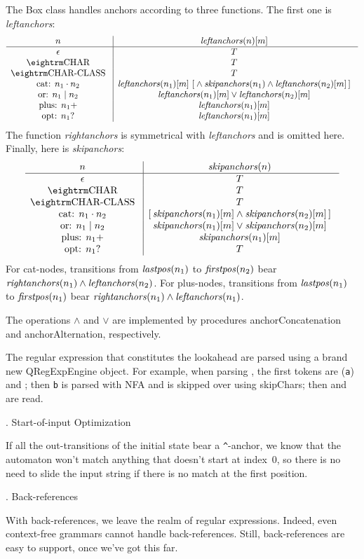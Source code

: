 The {\sf Box} class handles anchors according to three functions.  The first one is {\it leftanchors\/}:  $$\vbox{\halign{\g{#}\vrule && \g{$#$} \cr
  $n$                   & {\it leftanchors}(n)[m] \cr
\noalign{\hrule}
  $\epsilon$            & T \cr
  \tok{char}            & T \cr
  \tok{char-class}      & T \cr
  cat: $n_1 \cdot n_2$  & {\it leftanchors}(n_1)[m] \ [{} \land {\it skipanchors}(n_1) \land {\it leftanchors}(n_2)[m]\,] \cr
  or: $n_1 \mid n_2$    & {\it leftanchors}(n_1)[m] \lor {\it leftanchors}(n_2)[m] \cr
  plus: $n_1+$          & {\it leftanchors}(n_1)[m] \cr
  opt: $n_1?$           & {\it leftanchors}(n_1)[m] \cr
}}$$  The function {\it rightanchors\/} is symmetrical with {\it leftanchors} and is omitted here.  Finally, here is {\it skipanchors\/}:  $$\vbox{\halign{\g{#}\vrule && \g{$#$} \cr
  $n$                   & {\it skipanchors}(n) \cr
\noalign{\hrule}
  $\epsilon$            & T \cr
  \tok{char}            & T \cr
  \tok{char-class}      & T \cr
  cat: $n_1 \cdot n_2$  & [\,{\it skipanchors}(n_1)[m] \land {\it skipanchors}(n_2)[m]\,] \cr
  or: $n_1 \mid n_2$    & {\it skipanchors}(n_1)[m] \lor {\it skipanchors}(n_2)[m] \cr
  plus: $n_1+$          & {\it skipanchors}(n_1)[m] \cr
  opt: $n_1?$           & T \cr
}}$$  For cat-nodes, transitions from ${\it lastpos}(n_1)$ to ${\it firstpos}(n_2)$ bear ${\it rightanchors}(n_1) \land {\it leftanchors}(n_2)$.  For plus-nodes, transitions from ${\it lastpos}(n_1)$ to ${\it firstpos}(n_1)$ bear ${\it rightanchors}(n_1) \land {\it leftanchors}(n_1)$.

The operations $\land$ and $\lor$ are implemented by procedures {\sf anchorConcatenation} and {\sf anchorAlternation}, respectively.

The regular expression that constitutes the lookahead are parsed using a brand new {\sf QRegExpEngine} object.  For example, when parsing , the first tokens are  ({\tt a}) and ; then {\tt b} is parsed with NFA and is skipped over using {\sf skipChars}; then \lex{)} and  are read.

. Start-of-input Optimization

If all the out-transitions of the initial state bear a {\tt\^}-anchor, we know that the automaton won't match anything that doesn't start at index~$0$, so there is no need to slide the input string if there is no match at the first position.

. Back-references

With back-references, we leave the realm of regular expressions.  Indeed, even context-free grammars cannot handle back-references.  Still, back-references are easy to support, once we've got this far.

